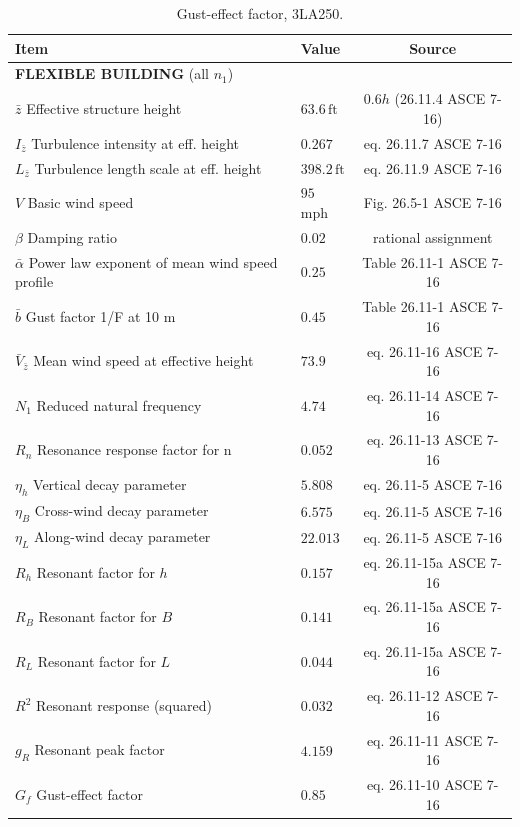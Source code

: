 \documentclass{simcenterdocumentation}
\newcommand{\ft}{\ensuremath{\,\mathrm{ft}}}
\begin{document}
\begin{table}[H]
\centering \caption{Gust-effect factor, 3LA250.}
\label{tab:gust_factor_8_story_bldg}
\begin{tabular}{llc}
\toprule
Item		& Value		& Source		\\
\midrule
\multicolumn{3}{l}{\textbf{FLEXIBLE BUILDING} (all $n_1$)}	\\
$\bar{z}$ Effective structure height							& $63.6 \ft$					& $0.6h$ (26.11.4 ASCE 7-16)	\\
$I_{\bar{z}}$ Turbulence intensity at eff. height				& $0.267$						& eq. 26.11.7 ASCE 7-16			\\
$L_{\bar{z}}$ Turbulence length scale at eff. height			& $398.2 \ft$					& eq. 26.11.9 ASCE 7-16			\\
$V$ Basic wind speed											& $95$ mph						& Fig. 26.5-1 ASCE 7-16			\\
$\beta$ Damping ratio											& $0.02$						& rational assignment			\\
$\bar{\alpha}$ Power law exponent of mean wind speed profile	& $0.25$						& Table 26.11-1 ASCE 7-16		\\
$\bar{b}$ Gust factor 1/F at 10 m								& $0.45$						& Table 26.11-1 ASCE 7-16		\\
$\bar{V}_{\bar{z}}$ Mean wind speed at effective height			& $73.9$						& eq. 26.11-16 ASCE 7-16		\\
$N_1$ Reduced natural frequency									& $4.74$						& eq. 26.11-14 ASCE 7-16		\\
$R_n$ Resonance response factor for n							& $0.052$						& eq. 26.11-13 ASCE 7-16		\\
$\eta_h$ Vertical decay parameter								& $5.808$						& eq. 26.11-5 ASCE 7-16			\\
$\eta_B$ Cross-wind decay parameter								& $6.575$						& eq. 26.11-5 ASCE 7-16			\\
$\eta_L$ Along-wind decay parameter								& $22.013$						& eq. 26.11-5 ASCE 7-16			\\
$R_h$ Resonant factor for $h$									& $0.157$							& eq. 26.11-15a ASCE 7-16			\\
$R_B$ Resonant factor for $B$									& $0.141$							& eq. 26.11-15a ASCE 7-16			\\
$R_L$ Resonant factor for $L$									& $0.044$							& eq. 26.11-15a ASCE 7-16			\\
$R^2$ Resonant response (squared)								& $0.032$							& eq. 26.11-12 ASCE 7-16			\\
$g_R$ Resonant peak factor										& $4.159$							& eq. 26.11-11 ASCE 7-16			\\
$G_f$ Gust-effect factor										& $0.85$							& eq. 26.11-10 ASCE 7-16			\\
\bottomrule
\end{tabular}
\end{table}
\end{document}
